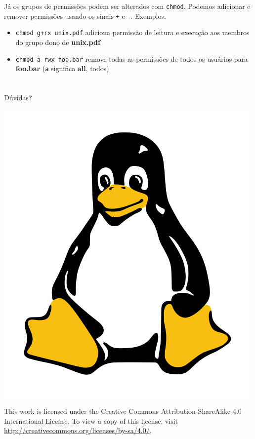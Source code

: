 \documentclass{beamer}
\begin{document}
\begin{frame}

	Já os grupos de permissões podem ser alterados com \texttt{chmod}. Podemos
	adicionar e remover permissões usando os sinais \texttt{+} e \texttt{-}.
	\newline
	Exemplos:
	\begin{itemize}
		\item \texttt{chmod g+rx unix.pdf} adiciona permissão de leitura e execução
			aos membros do grupo dono de \textbf{unix.pdf}
		\item \texttt{chmod a-rwx foo.bar} remove todas as permissões de todos os
			usuários para \textbf{foo.bar} (\texttt{a} significa \textbf{all}, todos)
	\end{itemize}

\end{frame}

\section{}

\begin{frame}
	\Huge{Dúvidas?}

	\includegraphics{images/tux.png}
\end{frame}

\begin{frame}
  This work is licensed under the Creative Commons Attribution-ShareAlike 4.0 International License. To view a copy of this license, visit \url{http://creativecommons.org/licenses/by-sa/4.0/}.
\end{frame}
\end{document}
